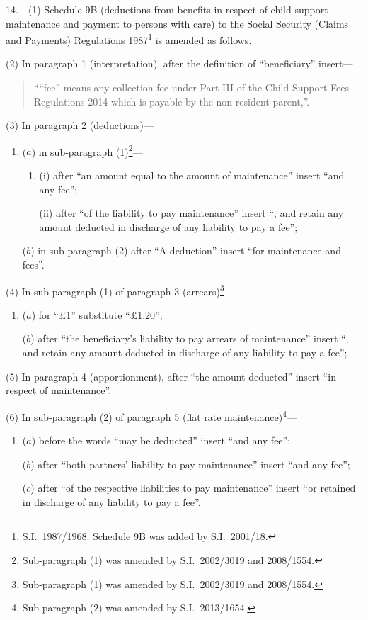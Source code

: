 \documentclass[12pt,a4paper]{article}
\begin{document}
14.—(1) Schedule 9B (deductions from benefits in respect of child support maintenance and payment to persons with care) to the Social Security (Claims and Payments) Regulations 1987\footnote{S.I.~1987/1968. Schedule 9B was added by S.I.~2001/18.} is amended as follows.

(2) In paragraph 1 (interpretation), after the definition of “beneficiary” insert—
\begin{quotation}
““fee” means any collection fee under Part III of the Child Support Fees Regulations 2014 which is payable by the non-resident parent,”.
\end{quotation}

(3) In paragraph 2 (deductions)—
\begin{enumerate}\item[]
($a$) in sub-paragraph (1)\footnote{Sub-paragraph (1) was amended by S.I.~2002/3019 and 2008/1554.}—
\begin{enumerate}\item[]
(i) after “an amount equal to the amount of maintenance” insert “and any fee”;

(ii) after “of the liability to pay maintenance” insert “, and retain any amount deducted in discharge of any liability to pay a fee”;
\end{enumerate}

($b$) in sub-paragraph (2) after “A deduction” insert “for maintenance and fees”.
\end{enumerate}

(4) In sub-paragraph (1) of paragraph 3 (arrears)\footnote{Sub-paragraph (1) was amended by S.I.~2002/3019 and 2008/1554.}—
\begin{enumerate}\item[]
($a$) for ``£1'' substitute “£1$.$20”;

($b$) after “the beneficiary’s liability to pay arrears of maintenance” insert “, and retain any amount deducted in discharge of any liability to pay a fee”;
\end{enumerate}

(5) In paragraph 4 (apportionment), after “the amount deducted” insert “in respect of maintenance”.

(6) In sub-paragraph (2) of paragraph 5 (flat rate maintenance)\footnote{Sub-paragraph (2) was amended by S.I.~2013/1654.}—
\begin{enumerate}\item[]
($a$) before the words “may be deducted” insert “and any fee”;

($b$) after “both partners’ liability to pay maintenance” insert “and any fee”;

($c$) after “of the respective liabilities to pay maintenance” insert “or retained in discharge of any liability to pay a fee”.
\end{enumerate}
\end{document}
